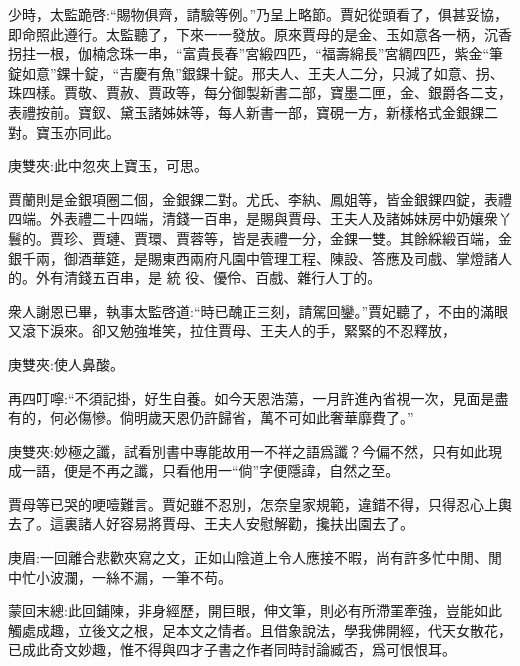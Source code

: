 \begin{parag}
    少時，太監跪啓:“賜物俱齊，請驗等例。”乃呈上略節。賈妃從頭看了，俱甚妥協，即命照此遵行。太監聽了，下來一一發放。原來賈母的是金、玉如意各一柄，沉香拐拄一根，伽楠念珠一串，“富貴長春”宮緞四匹，“福壽綿長”宮綢四匹，紫金“筆錠如意”錁十錠，“吉慶有魚”銀錁十錠。邢夫人、王夫人二分，只減了如意、拐、珠四樣。賈敬、賈赦、賈政等，每分御製新書二部，寶墨二匣，金、銀爵各二支，表禮按前。寶釵、黛玉諸姊妹等，每人新書一部，寶硯一方，新樣格式金銀錁二對。寶玉亦同此。\begin{note}庚雙夾:此中忽夾上寶玉，可思。\end{note}賈蘭則是金銀項圈二個，金銀錁二對。尤氏、李紈、鳳姐等，皆金銀錁四錠，表禮四端。外表禮二十四端，清錢一百串，是賜與賈母、王夫人及諸姊妹房中奶孃衆丫鬟的。賈珍、賈璉、賈環、賈蓉等，皆是表禮一分，金錁一雙。其餘綵緞百端，金銀千兩，御酒華筵，是賜東西兩府凡園中管理工程、陳設、答應及司戲、掌燈諸人的。外有清錢五百串，是 統 役、優伶、百戲、雜行人丁的。
\end{parag}


\begin{parag}
    衆人謝恩已畢，執事太監啓道:“時已醜正三刻，請駕回鑾。”賈妃聽了，不由的滿眼又滾下淚來。卻又勉強堆笑，拉住賈母、王夫人的手，緊緊的不忍釋放，\begin{note}庚雙夾:使人鼻酸。\end{note}再四叮嚀:“不須記掛，好生自養。如今天恩浩蕩，一月許進內省視一次，見面是盡有的，何必傷慘。倘明歲天恩仍許歸省，萬不可如此奢華靡費了。”\begin{note}庚雙夾:妙極之讖，試看別書中專能故用一不祥之語爲讖？今偏不然，只有如此現成一語，便是不再之讖，只看他用一“倘”字便隱諱，自然之至。\end{note}賈母等已哭的哽噎難言。賈妃雖不忍別，怎奈皇家規範，違錯不得，只得忍心上輿去了。這裏諸人好容易將賈母、王夫人安慰解勸，攙扶出園去了。\begin{note}庚眉:一回離合悲歡夾寫之文，正如山陰道上令人應接不暇，尚有許多忙中閒、閒中忙小波瀾，一絲不漏，一筆不苟。\end{note}
\end{parag}


\begin{parag}
    \begin{note}蒙回末總:此回鋪陳，非身經歷，開巨眼，伸文筆，則必有所滯罣牽強，豈能如此觸處成趣，立後文之根，足本文之情者。且借象說法，學我佛開經，代天女散花，已成此奇文妙趣，惟不得與四才子書之作者同時討論臧否，爲可恨恨耳。\end{note}
\end{parag}